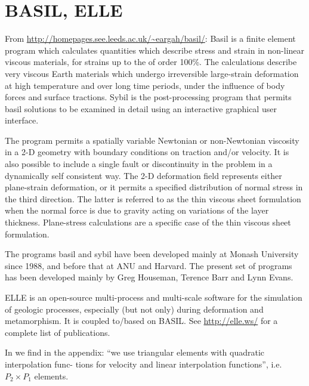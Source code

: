 \section{BASIL, ELLE} 

From \url{http://homepages.see.leeds.ac.uk/~eargah/basil/}:
Basil is a finite element program which calculates quantities which describe  stress 
and strain in non-linear viscous materials, for strains up to the of order 100\%.   
The calculations  describe  very  viscous  Earth materials which undergo irreversible large-strain 
deformation at  high  temperature  and over long time periods, under the influence of body 
forces and surface tractions.  Sybil  is the post-processing program that permits basil 
solutions to be examined in detail using an interactive graphical user interface.

The program permits a spatially variable Newtonian  or  non-Newtonian  viscosity  in a 2-D 
geometry with boundary conditions on traction and/or velocity.  It is also  possible  
to include  a single fault or discontinuity in the problem in a dynamically self consistent way.  
The 2-D deformation  field represents  either plane-strain deformation, or it permits 
a specified distribution of normal stress in the third  direction.   The  latter is referred 
to as the thin viscous sheet formulation when the normal force is due to  gravity  acting on 
variations of the layer thickness.  Plane-stress calculations are a specific case of 
the thin viscous sheet formulation.

The programs basil and sybil have been developed  mainly  at Monash  University  since  1988,  
and before that at ANU and Harvard.  The present set of  programs  has  been  developed mainly  by  
Greg  Houseman, Terence  Barr  and  Lynn Evans.

ELLE is an open-source multi-process and multi-scale software for the simulation of geologic processes, 
especially (but not only) during deformation and metamorphism. It is coupled to/based on BASIL. 
See \url{http://elle.ws/} for a complete list of publications.

In \textcite{baho96} we find in the appendix: ``we use triangular elements with quadratic interpolation func-
tions for velocity and linear interpolation functions'', i.e. $P_2 \times P_1$ elements.

